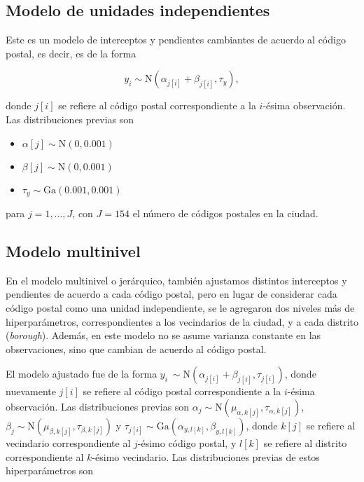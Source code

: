 \subsection{Modelo de unidades independientes}

Este es un modelo de interceptos y pendientes cambiantes de acuerdo al código postal, es decir, es de la forma 

\[
	y_i \sim \mathrm{N}(\alpha_{j[i]} + \beta_{j[i]}, \tau_y),
\]

donde $j[i]$ se refiere al código postal correspondiente a la $i$-ésima observación. Las distribuciones previas son 

\begin{itemize}
	\item $\alpha[j] \sim \mathrm{N}(0, 0.001)$
	\item $\beta[j] \sim \mathrm{N}(0, 0.001)$
	\item $\tau_y \sim \mathrm{Ga}(0.001, 0.001)$
\end{itemize}

para $j = 1, \hdots, J$, con $J = 154$ el número de códigos postales en la ciudad.

\subsection{Modelo multinivel}

En el modelo multinivel o jerárquico, también ajustamos distintos interceptos y pendientes de acuerdo a cada código postal, pero en lugar de considerar cada código postal como una unidad independiente, se le agregaron dos niveles más de hiperparámetros, correspondientes a los vecindarios de la ciudad, y a cada distrito (\textit{borough}). Además, en este modelo no se asume varianza constante en las observaciones, sino que cambian de acuerdo al código postal.

El modelo ajustado fue de la forma $y_i ~ \sim \mathrm{N}(\alpha_{j[i]} + \beta_{j[i]}, \tau_{j[i]})$, donde nuevamente $j[i]$ se refiere al código postal correspondiente a la $i$-ésima observación. Las distribuciones previas son $\alpha_j \sim \mathrm{N} (\mu_{\alpha, k[j]}, \tau_{\alpha, k[j]})$, $\beta_j \sim \mathrm{N} (\mu_{\beta, k[j]}, \tau_{\beta, k[j]})$ y $\tau_{j[i]} \sim \mathrm{Ga}(\alpha_{y, l[k]}, \beta_{y, l[k]})$, donde $k[j]$ se refiere al vecindario correspondiente al $j$-ésimo código postal, y $l[k]$ se refiere al distrito correspondiente al $k$-ésimo vecindario. Las distribuciones previas de estos hiperparámetros son 

